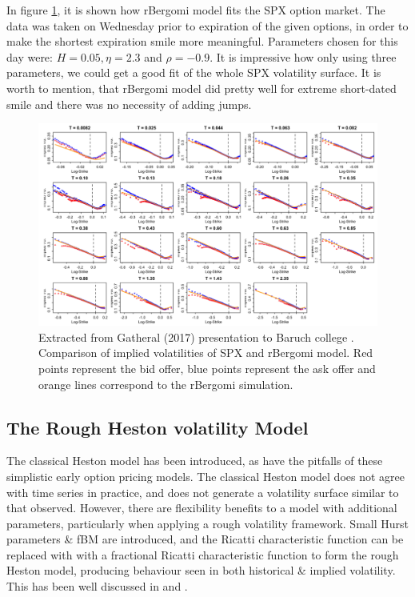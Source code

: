 \documentclass[12pt,oneside]{article}
\begin{document}
In figure \ref{fig:Rough_vol_columbia_fig8}, it is shown how rBergomi model fits the SPX option market. The data was taken on Wednesday prior to expiration of the given options, in order to make the shortest expiration smile more meaningful. Parameters chosen for this day were: $H = 0.05, \eta = 2.3$ and $\rho = -0.9$. It is impressive how only using three parameters, we could get a good fit of the whole SPX volatility surface. It is worth to mention, that rBergomi model did pretty well for extreme short-dated smile and there was no necessity of adding jumps.

\begin{figure}[htpb]
    \centering
    \includegraphics[width=1.0\textwidth ]{figs/Rough_vol_columbia_fig8}
    \caption{Extracted from Gatheral (2017) presentation to Baruch college \cite[Figure~8]{Rough_vol_columbia}. Comparison of implied volatilities of SPX and rBergomi model. Red points represent the bid offer, blue points represent the ask offer and orange lines correspond to the rBergomi simulation.}
    \label{fig:Rough_vol_columbia_fig8}
\end{figure}

\subsection{The Rough Heston volatility Model}
\label{sebsec:rough_heston}
The classical Heston model has been introduced, as have the pitfalls  of these simplistic early option pricing models. The classical Heston model does not agree with time series in practice, and does not generate a volatility surface similar to that observed. However, there are flexibility benefits to a model with additional parameters, particularly when applying a rough volatility framework. Small Hurst parameters & fBM are introduced, and the Ricatti characteristic function can be replaced with with a fractional Ricatti characteristic function to form the rough Heston model, producing behaviour seen in both historical & implied volatility. This has been well discussed in \cite{OElEuch2018} and \cite{ElEuchRosenbaum19}.
\\
\end{document}
